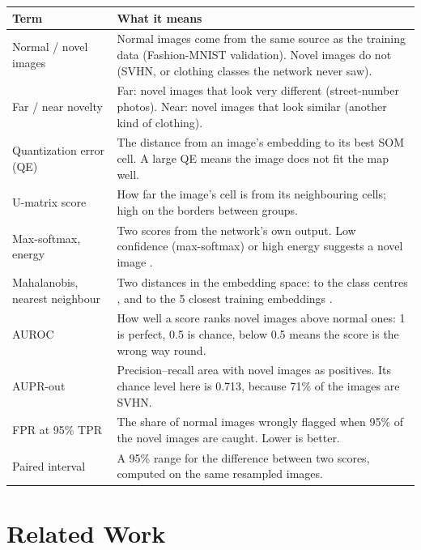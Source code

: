 \documentclass[11pt]{article}
\begin{document}
{\small
\renewcommand{\arraystretch}{1.12}
\begin{tabularx}{\textwidth}{|>{\raggedright\arraybackslash}p{}|X|}
\hline
\textbf{Term} & \textbf{What it means} \\ \hline
Normal / novel images & Normal images come from the same source as the training data (Fashion-MNIST validation). Novel images do not (SVHN, or clothing classes the network never saw). \\ \hline
Far / near novelty & Far: novel images that look very different (street-number photos). Near: novel images that look similar (another kind of clothing). \\ \hline
Quantization error (QE) & The distance from an image's embedding to its best SOM cell. A large QE means the image does not fit the map well. \\ \hline
U-matrix score & How far the image's cell is from its neighbouring cells; high on the borders between groups. \\ \hline
Max-softmax, energy & Two scores from the network's own output. Low confidence (max-softmax) or high energy suggests a novel image \cite{hendrycks2017baseline,liu2020energy}. \\ \hline
Mahalanobis, nearest neighbour & Two distances in the embedding space: to the class centres \cite{lee2018mahalanobis}, and to the 5 closest training embeddings \cite{sun2022knn}. \\ \hline
AUROC & How well a score ranks novel images above normal ones: 1 is perfect, 0.5 is chance, below 0.5 means the score is the wrong way round. \\ \hline
AUPR-out & Precision–recall area with novel images as positives. Its chance level here is 0.713, because 71\% of the images are SVHN. \\ \hline
FPR at 95\% TPR & The share of normal images wrongly flagged when 95\% of the novel images are caught. Lower is better. \\ \hline
Paired interval & A 95\% range for the difference between two scores, computed on the same resampled images. \\ \hline
\end{tabularx}}

\section{Related Work}
\end{document}
